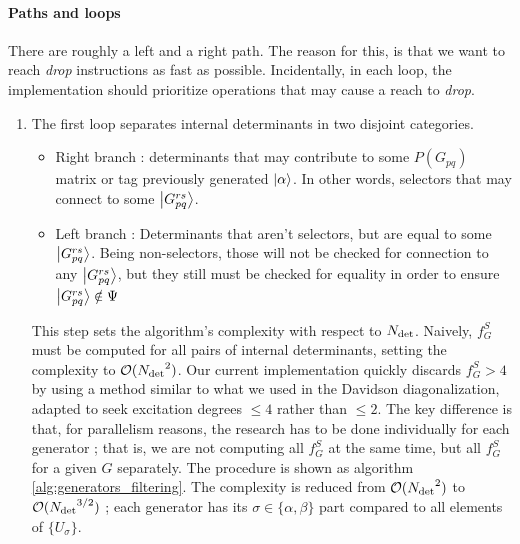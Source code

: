 \documentclass[./thesis.tex]{subfiles}
\newcommand{\Gpqrs}{\ket{G^{rs}_{pq}}}
\begin{document}
\paragraph{Paths and loops}
There are roughly a left and a right path. The reason for this, is that we want to reach \emph{drop} instructions as fast as possible. Incidentally, in each loop, the implementation should prioritize operations that may cause a reach to \emph{drop}.


\begin{enumerate}

\item
The first loop separates internal determinants in two disjoint categories.


\begin{itemize}
\item
Right branch : determinants that may contribute to some $P(G_{pq})$ matrix or tag previously generated $\ket \alpha$. In other words, selectors that may connect to some $\ket {G_{pq}^{rs}}$. 

\item
Left branch : Determinants that aren't selectors, but are equal to some $\ket {G_{pq}^{rs}}$. Being non-selectors, those will not be checked for connection to any $\ket {G_{pq}^{rs}}$, but they still must be checked for equality in order to ensure $\ket {G_{pq}^{rs}} \notin \Psi$
\end{itemize}
This step sets the algorithm's complexity with respect to ${N_\text{det}}$. Naively, $f_G^S$ must be computed for all pairs of internal determinants, setting the complexity to $\mathcal{O}({N_\text{det}}^2)$. Our current implementation quickly discards $f_G^S > 4$ by using a method similar to what we used in the Davidson diagonalization, adapted to seek excitation degrees $\leq 4$ rather than $\leq 2$. The key difference is that, for parallelism reasons, the research has to be done individually for each generator ; that is, we are not computing all $f_G^S$ at the same time, but all $f_G^S$ for a given $G$ separately. The procedure is shown as algorithm \ref{alg:generators_filtering}. The complexity is reduced from $\mathcal{O}({N_\text{det}}^2)$ to $\mathcal{O}({N_\text{det}}^{3/2})$ ; each generator has its $\sigma \in \{\alpha, \beta\}$ part compared to all elements of $\{U_\sigma\}$.


\end{enumerate}
\end{document}
